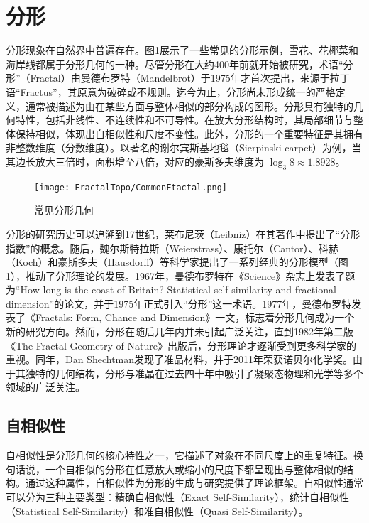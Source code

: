 \section{分形}
分形现象在自然界中普遍存在。图\ref{fig:CommonFtactal}展示了一些常见的分形示例，雪花、花椰菜和海岸线都属于分形几何的一种。尽管分形在大约400年前就开始被研究，术语“分形”（Fractal）由曼德布罗特（Mandelbrot）于1975年才首次提出\cite{mandelbrot1975fractals}，来源于拉丁语“Fractus”，其原意为破碎或不规则。迄今为止，分形尚未形成统一的严格定义，通常被描述为由在某些方面与整体相似的部分构成的图形。分形具有独特的几何特性，包括非线性、不连续性和不可导性。在放大分形结构时，其局部细节与整体保持相似，体现出自相似性和尺度不变性\cite{Mandelbrot1982}。此外，分形的一个重要特征是其拥有非整数维度（分数维度）。以著名的谢尔宾斯基地毯（Sierpinski carpet）为例，当其边长放大三倍时，面积增至八倍，对应的豪斯多夫维度为 $\log_3 8 \approx 1.8928$。

\begin{figure}[htbp]
    \centering
    \texttt{[image: FractalTopo/CommonFtactal.png]}
    \caption{常见分形几何}
    \label{fig:CommonFtactal}
\end{figure}

分形的研究历史可以追溯到17世纪，莱布尼茨（Leibniz）在其著作中提出了“分形指数”的概念。随后，魏尔斯特拉斯（Weierstrass）、康托尔（Cantor）、科赫（Koch）和豪斯多夫（Hausdorff）等科学家提出了一系列经典的分形模型（图\ref{fig:CommonFtactal}），推动了分形理论的发展。1967年，曼德布罗特在《Science》杂志上发表了题为“How long is the coast of Britain? Statistical self-similarity and fractional dimension”的论文\cite{mandelbrot1967coast}，并于1975年正式引入“分形”这一术语\cite{mandelbrot1975fractals}。1977年，曼德布罗特发表了《Fractals: Form, Chance and Dimension》一文\cite{mandelbrot1977fractals}，标志着分形几何成为一个新的研究方向。然而，分形在随后几年内并未引起广泛关注，直到1982年第二版《The Fractal Geometry of Nature》出版后\cite{Mandelbrot1982}，分形理论才逐渐受到更多科学家的重视。同年，Dan Shechtman发现了准晶材料\cite{shechtman1984metallic}，并于2011年荣获诺贝尔化学奖。由于其独特的几何结构，分形与准晶在过去四十年中吸引了凝聚态物理和光学等多个领域的广泛关注。

\subsection{自相似性}
自相似性是分形几何的核心特性之一，它描述了对象在不同尺度上的重复特征。换句话说，一个自相似的分形在任意放大或缩小的尺度下都呈现出与整体相似的结构。通过这种属性，自相似性为分形的生成与研究提供了理论框架。自相似性通常可以分为三种主要类型：精确自相似性（Exact Self-Similarity），统计自相似性（Statistical Self-Similarity）和准自相似性（Quasi Self-Similarity）。

